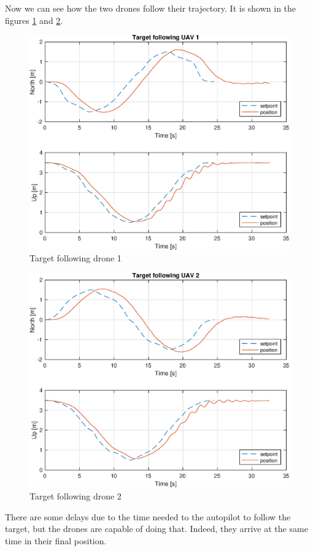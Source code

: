 Now we can see how the two drones follow their trajectory. It is shown in the figures
\ref{fig:following_1} and \ref{fig:following_2}.

\begin{figure}
\centering
\includegraphics[width=0.7\linewidth]{chapters/chapter-04/figures/following_1.eps}
\caption{Target following drone 1}
\label{fig:following_1}
\end{figure}

\begin{figure}
\centering
\includegraphics[width=0.7\linewidth]{chapters/chapter-04/figures/following_2.eps}
\caption{Target following drone 2}
\label{fig:following_2}
\end{figure}

There are some delays due to the time needed to the autopilot to follow
the target, but the drones are capable of doing that.
Indeed, they arrive at the same time in their final position.

